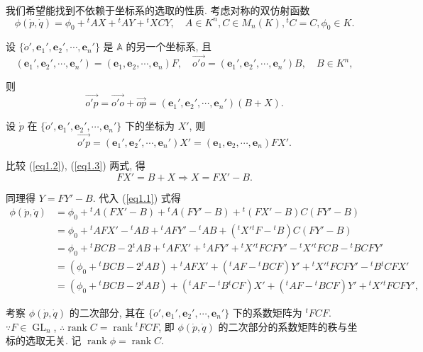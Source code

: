\documentclass{ctexart}
\begin{document}
我们希望能找到不依赖于坐标系的选取的性质. 考虑对称的双仿射函数
\begin{equation}\label{eq1.1}
    \phi(\dot{p},\dot{q})=\phi_0+{}^tAX+{}^tAY+{}^tXCY,\quad A\in K^n,C\in M_n(K),{}^tC=C,\phi_0\in K.
\end{equation}

设 $\{\dot{o}',\boldsymbol{e}_1',\boldsymbol{e}_2',\cdots,\boldsymbol{e}_n'\}$ 是 $\mathbb{A}$ 的另一个坐标系, 且
\[(\boldsymbol{e}_1',\boldsymbol{e}_2',\cdots,\boldsymbol{e}_n')=(\boldsymbol{e}_1,\boldsymbol{e}_2,\cdots,\boldsymbol{e}_n)F,\quad\overrightarrow{o'o}=(\boldsymbol{e}_1',\boldsymbol{e}_2',\cdots,\boldsymbol{e}_n')B,\quad B\in K^n,\]

则
\begin{equation}\label{eq1.2}
    \overrightarrow{o'p}=\overrightarrow{o'o}+\overrightarrow{op}=(\boldsymbol{e}_1',\boldsymbol{e}_2',\cdots,\boldsymbol{e}_n')(B+X).
\end{equation}

设 $\dot{p}$ 在 $\{\dot{o}',\boldsymbol{e}_1',\boldsymbol{e}_2',\cdots,\boldsymbol{e}_n'\}$ 下的坐标为 $X'$, 则
\begin{equation}\label{eq1.3}
    \overrightarrow{o'p}=(\boldsymbol{e}_1',\boldsymbol{e}_2',\cdots,\boldsymbol{e}_n')X'=(\boldsymbol{e}_1,\boldsymbol{e}_2,\cdots,\boldsymbol{e}_n)FX'.
\end{equation}

比较 (\ref{eq1.2}), (\ref{eq1.3}) 两式, 得
\[FX'=B+X\Rightarrow X=FX'-B.\]

同理得 $Y=FY'-B$. 代入 (\ref{eq1.1}) 式得
\begin{align*}
    \phi(\dot{p},\dot{q}) & =\phi_0+{}^tA(FX'-B)+{}^tA(FY'-B)+{}^t(FX'-B)C(FY'-B) \\
    & =\phi_0+{}^tAFX'-{}^tAB+{}^tAFY'-{}^tAB+({}^tX'{}^tF-{}^tB)C(FY'-B) \\
    & =\phi_0+{}^tBCB-2{}^tAB+{}^tAFX'+{}^tAFY'+{}^tX'{}^tFCFY'-{}^tX'{}^tFCB-{}^tBCFY' \\
    & =(\phi_0+{}^tBCB-2{}^tAB)+{}^tAFX'+({}^tAF-{}^tBCF)Y'+{}^tX'{}^tFCFY'-{}^tB{}^tCFX' \\
    & =(\phi_0+{}^tBCB-2{}^tAB)+({}^tAF-{}^tB{}^tCF)X'+({}^tAF-{}^tBCF)Y'+{}^tX'{}^tFCFY',
\end{align*}

考察 $\phi(\dot{p},\dot{q})$ 的二次部分, 其在 $\{\dot{o}',\boldsymbol{e}_1',\boldsymbol{e}_2',\cdots,\boldsymbol{e}_n'\}$ 下的系数矩阵为 ${}^tFCF$. $\because F\in\operatorname{GL}_n$, $\therefore\operatorname{rank}C=\operatorname{rank}{}^tFCF$, 即 $\phi(\dot{p},\dot{q})$ 的二次部分的系数矩阵的秩与坐标的选取无关. 记 $\operatorname{rank}\phi=\operatorname{rank}C$.
\end{document}
